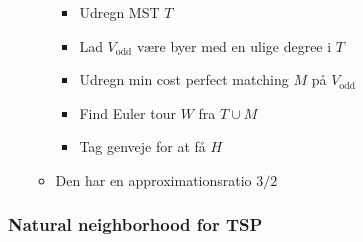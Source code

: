 \begin{itemize}
\begin{itemize}
    \begin{itemize}
    	\item Udregn MST $T$
      \item Lad $V_{\text{odd}}$ være byer med en ulige degree i $T$
      \item Udregn min cost perfect matching $M$ på $V_\text{odd}$
      \item Find Euler tour $W$ fra $T \cup M$
      \item Tag genveje for at få $H$
    \end{itemize}
    \item Den har en approximationsratio $3/2$
  \end{itemize}
\end{itemize}

\subsubsection{Natural neighborhood for TSP}
